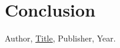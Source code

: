 \documentclass{article}
\theoremstyle{theorem}
\theoremstyle{definition}
\theoremstyle{remark}
\begin{document}
\section{Conclusion}\label{conclusion}


\begin{thebibliography}{99}
 Author, \href{https://en.wikipedia.org/wiki/LaTeX}{Title}, Publisher, Year.
\end{thebibliography}
\end{document}
